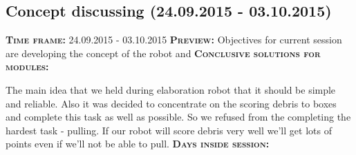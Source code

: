 \subsection{Concept discussing (24.09.2015 - 03.10.2015)}
	\textsc{\textbf{Time frame:}} 24.09.2015 - 03.10.2015 \newline
	\textsc{\textbf{Preview:}} Objectives for current session are developing the concept of the robot and  \newline \newline
	\textsc{\textbf{Conclusive solutions for modules:}}
	
	
	The main idea that we held during elaboration robot that it should be simple and reliable. Also it was decided to concentrate on the scoring debris to boxes and complete this task as well as possible. So we refused from the completing the hardest task - pulling. If our robot will score debris very well we'll get lots of points even if we'll not be able to pull.
  \textsc{\textbf{Days inside session:}}
  
  
  
  
  
